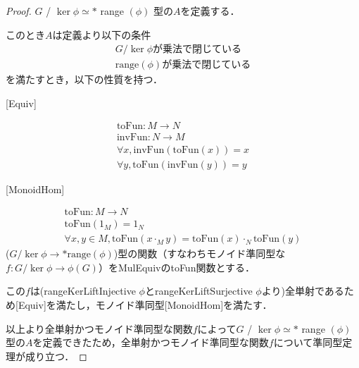 \begin{proof}
     $G$ / $\ker \phi \simeq *$ range $(\phi)$ 型の$A$を定義する．

     このとき$A$は定義より以下の条件
     \begin{align}
        G / \ker \phi\text{が乗法で閉じている}\\
        \text{range} (\phi)\text{が乗法で閉じている}
     \end{align}
     を満たすとき，以下の性質を持つ．

     [Equiv]

     \begin{align}
        \text{toFun} : M \rightarrow N \\
        \text{invFun} : N \rightarrow M \\
        \forall x , \text{invFun}(\text{toFun}(x))=x\\
        \forall y , \text{toFun}(\text{invFun}(y))=y
     \end{align}

     [MonoidHom]

     \begin{align}
        \text{toFun} : M \rightarrow N\\
        \text{toFun}(1_M)=1_N\\
        \forall x,y \in M,\text{toFun}(x\cdot_M y)=\text{toFun}(x)\cdot_N \text{toFun}(y)
     \end{align}
     ($G / \ker \phi →* \text{range} (\phi)$)型の関数（すなわちモノイド準同型な$f : G / \ker \phi → \phi(G)$）をMulEquivのtoFun関数とする．

     この$f$は(rangeKerLiftInjective $\phi$とrangeKerLiftSurjective $\phi$より)全単射であるため[Equiv]を満たし，モノイド準同型[MonoidHom]を満たす．

     以上より全単射かつモノイド準同型な関数$f$によって$G$ / $\ker \phi \simeq *$ range $(\phi)$ 型の$A$を定義できたため，全単射かつモノイド準同型な関数$f$について準同型定理が成り立つ．
\end{proof}

